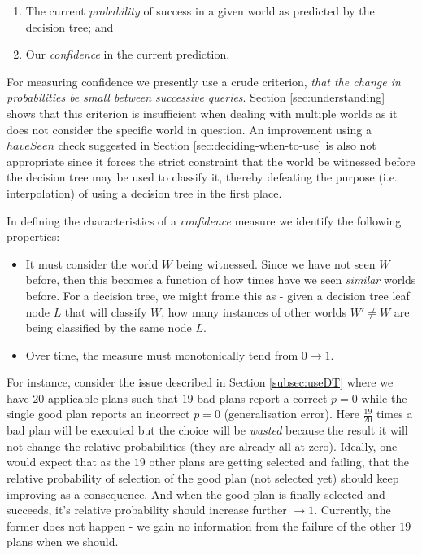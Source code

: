 \documentclass[a4paper]{article}
\newcommand{\dt}{{decision tree}\xspace}
\begin{document}
\begin{enumerate}
\item The current \textit{probability} of success in a given world as predicted by the \dt; and
\item Our \textit{confidence} in the current prediction.
\end{enumerate}

For measuring confidence we presently use a crude criterion, \textit{that the change in probabilities be small between successive queries}. Section \ref{sec:understanding} shows that this criterion is insufficient when dealing with multiple worlds as it does not consider the specific world in question. An improvement using a $haveSeen$ check suggested in Section \ref{sec:deciding-when-to-use} is also not appropriate since it forces the strict constraint that the world be witnessed before the \dt may be used to classify it, thereby defeating the purpose (i.e. interpolation) of using a \dt in the first place. 

In defining the characteristics of a \textit{confidence} measure we identify the following properties:
\begin{itemize}
\item It must consider the world $W$ being witnessed. Since we have not seen $W$ before, then this becomes a function of how times have we seen \textit{similar} worlds before. For a \dt, we might frame this as - given a \dt leaf node $L$ that will classify $W$, how many instances of other worlds $W' \neq W$ are being classified by the same node $L$.
\item Over time, the measure must monotonically tend from $0 \to 1$.
\end{itemize}

For instance, consider the issue described in Section \ref{subsec:useDT} where we have $20$ applicable plans such that $19$ bad plans report a correct $p=0$ while the single good plan reports an incorrect $p=0$ (generalisation error). Here $\frac{19}{20}$ times a bad plan will be executed but the choice will be \textit{wasted} because the result it will not change the relative probabilities (they are already all at zero). Ideally, one would expect that as the $19$ other plans are getting selected and failing, that the relative probability of selection of the good plan (not selected yet) should keep improving as a consequence. And when the good plan is finally selected and succeeds, it's relative probability should increase further $\to 1$. Currently, the former does not happen - we gain no information from the failure of the other $19$ plans when we should.
\end{document}

